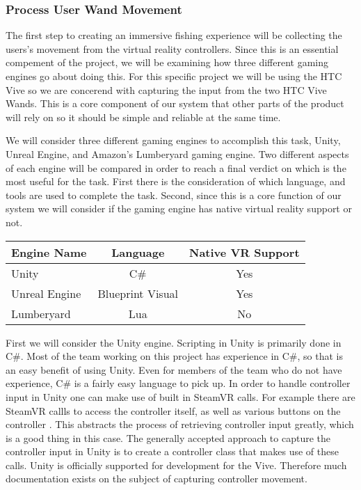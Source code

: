 \documentclass[10pt,journal,compsoc,onecolumn, draftclsnofoot]{IEEEtran}
\begin{document}
\subsubsection{Process User Wand Movement}
The first step to creating an immersive fishing experience will be collecting the users's movement from the virtual reality controllers.
Since this is an essential compement of the project, we will be examining how three different gaming engines go about doing this.
For this specific project we will be using the HTC Vive so we are concerend with capturing the input from the two HTC Vive Wands.
This is a core component of our system that other parts of the product will rely on so it should be simple and reliable at the same time.

We will consider three different gaming engines to accomplish this task, Unity, Unreal Engine, and Amazon's Lumberyard gaming engine.
Two different aspects of each engine will be compared in order to reach a final verdict on which is the most useful for the task.
First there is the consideration of which language, and tools are used to complete the task.
Second, since this is a core function of our system we will consider if the gaming engine has native virtual reality support or not.

\vspace{2mm}
\begin{table}[h!]
\centering
  \begin{tabular}{ | l || c | c |  }
  \hline
  Engine Name & Language & Native VR Support\\
  \hline
  Unity  & C\# & Yes\\ \hline
  Unreal Engine & Blueprint Visual & Yes\\ \hline
  Lumberyard & Lua & No\\ \hline
  \hline
  \end{tabular}
\end{table}
\vspace{2mm}

First we will consider the Unity engine. Scripting in Unity is primarily done in C\#.
Most of the team working on this project has experience in C\#, so that is an easy benefit of using Unity.
Even for members of the team who do not have experience, C\# is a fairly easy language to pick up.
In order to handle controller input in Unity one can make use of built in SteamVR calls.
For example there are SteamVR callls to access the controller itself, as well as various buttons on the controller \cite{steamvr_controllers}.
This abstracts the process of retrieving controller input greatly, which is a good thing in this case.
The generally accepted approach to capture the controller input in Unity is to create a controller class that makes use of these calls.
Unity is officially supported for development for the Vive.
Therefore much documentation exists on the subject of capturing controller movement.
\end{document}
